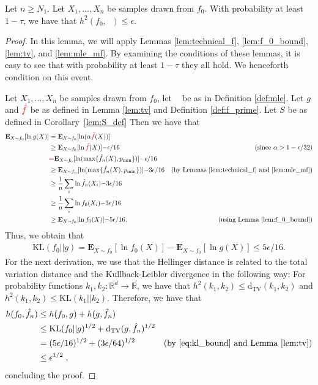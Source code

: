 \documentclass[final,12pt]{colt2018}
\newcommand{\nnew}[1]{{\color{red} #1}}
\newcommand{\nnew}[1]{#1}
\newtheorem{informal theorem}[theorem]{Theorem (informal statement)}
\newcommand{\E}{\mathbf{E}}
\newcommand{\eps}{\epsilon}
\newcommand{\TV}{\mathrm{d_{TV}}}
\newcommand{\KL}{\mathrm{KL}}
\newcommand{\mle}{\mathop{\hat{f}_n}}
\newcommand{\pmin}{\mathop{p_{\mathrm{min}}}}
\begin{document}
\begin{lemma}\label{lem:mle_dist_N_1}
Let $n \geq N_1$.
Let $X_1, \ldots, X_n$ be samples drawn from $f_0$.
With probability at least $1 - \tau$, we have that $h^2(f_0, \mle) \leq \eps$.
\end{lemma}
\begin{proof}
In this lemma, we will apply Lemmas \ref{lem:technical_f}, \ref{lem:f_0_bound}, \ref{lem:tv}, and \ref{lem:mle_mf}. 
By examining the conditions of these lemmas, it is easy to see that with probability at least $1 - \tau$ they all hold. 
We henceforth condition on this event.

Let $X_1, \ldots, X_n$ be samples drawn from $f_0$, let $\mle$ be as in Definition \ref{def:mle}.
Let $g$ and $\nnew{\tilde{f}}$ be as defined in Lemma \ref{lem:tv} and Definition \ref{def:f_prime}.
Let $S$ be as defined in Corollary~\ref{lem:S_def}
Then we have that
\begin{align*}
{\E}_{X \sim f_0}[\ln g(X)] &= {\E}_{X \sim f_0}[\ln(\alpha \nnew{\tilde{f}}(X))] \\
&\geq {\E}_{X \sim f_0}[\ln \nnew{\tilde{f}}(X)]  {- \eps/16} & \text{(since  {$\alpha > 1-\eps/32$})} \\
&\nnew{=} {\E}_{X \sim f_0}[\ln(\max\{\mle(X), \pmin\})]  {- \eps/16} \\
&\geq {\E}_{X \sim f_n}[\ln(\max\{\mle(X), \pmin\})]  {- 3\eps/16} & \text{(by Lemmas \ref{lem:technical_f} and \ref{lem:mle_mf})} \\
&\geq \frac{1}{n} \sum_i \ln \mle(X_i)  {- 3\eps/16} \\
&\geq \frac{1}{n} \sum_i \ln f_0(X_i)  {- 3\eps/16} \\ %
&\geq {\E}_{X \sim f_0}[\ln f_0(X)]  {- 5\eps/16}. & \text{(using Lemma \ref{lem:f_0_bound})}
\end{align*}
Thus, we obtain that
\begin{align}
\KL(f_0 || g) = {\E}_{X \sim f_0}[\ln f_0(X)] - {\E}_{X \sim f_0}[\ln g(X)] \leq  {5\eps/16}. \label{eq:kl_bound}
\end{align}
For the next derivation, we use that the Hellinger distance is related to the total variation distance and the Kullback-Leibler divergence in the following way: For probability functions $k_1, k_2 : \mathbb{R}^d \rightarrow \mathbb{R}$, we have that $h^2(k_1,k_2) \leq \TV(k_1,k_2)$ and $h^2(k_1,k_2) \leq \KL(k_1 || k_2)$.
Therefore, we have that
\begin{align*}
h(f_0, \mle) &\leq h(f_0, g) + h(g, \mle) \\
&\leq \KL(f_0 || g)^{1/2} + \TV(g, \mle)^{1/2} \\
&=  {(5\eps/16)^{1/2}} +  {(3\eps/64)^{1/2}} & \text{(by \eqref{eq:kl_bound} and Lemma \ref{lem:tv})} \\
&\leq \eps^{1/2} \;,
\end{align*}
concluding the proof.
\end{proof}
\end{document}
